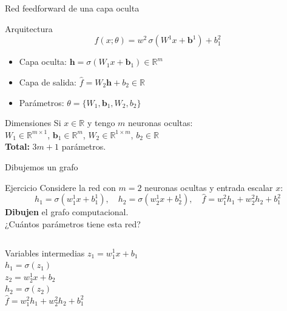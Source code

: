 \documentclass[aspectratio=169,12pt]{beamer}
\begin{document}
\begin{frame}{Red feedforward de una capa oculta}

\begin{defbox}{Arquitectura}
\[
  \hat{f}(x;\theta) = w^2\,\sigma(W^1 x + \bm{b}^1) + b_1^2
\]
\begin{itemize}
  \item Capa oculta: $\bm{h} = \sigma(W_1 x + \bm{b}_1) \in \mathbb{R}^m$
  \item Capa de salida: $\hat{f} = W_2\bm{h} + b_2 \in \mathbb{R}$
  \item Parámetros: $\theta = \{W_1, \bm{b}_1, W_2, b_2\}$
\end{itemize}
\end{defbox}

\begin{obsbox}{Dimensiones}
Si $x \in \mathbb{R}$ y tengo $m$ neuronas ocultas:\\
$W_1 \in \mathbb{R}^{m\times 1}$, $\bm{b}_1 \in \mathbb{R}^m$, $W_2 \in \mathbb{R}^{1\times m}$, $b_2 \in \mathbb{R}$\\
\textbf{Total:} $3m + 1$ parámetros.
\end{obsbox}

\end{frame}

\begin{frame}[fragile]{Dibujemos un grafo}
\begin{taskbox}{Ejercicio}
Considere la red con $m=2$ neuronas ocultas y entrada escalar $x$:
\[
  h_1 = \sigma(w_{1}^1x + b_1^1), \quad h_2 = \sigma(w_{2}^1x + b_2^1), \quad \hat{f} = w_1^2 h_1 + w_2^2 h_2 + b_1^2
\]
\textbf{Dibujen} el grafo computacional. \\[4pt]
¿Cuántos parámetros tiene esta red?
\end{taskbox}

\vspace{-0.7cm}
\begin{columns}[T]
\begin{obsbox}{Variables intermedias}
$z_1 = w_{1}^1x + b_1$\\
$h_1 = \sigma(z_1)$\\
$z_2 = w_{2}^1x + b_2$\\
$h_2 = \sigma(z_2)$\\
$\hat{f} = w_1^2 h_1 + w_2^2 h_2 + b_1^2$
\end{obsbox}

\end{columns}
\end{frame}
\end{document}

